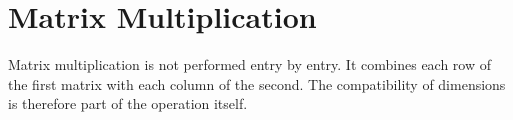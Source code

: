\section{Matrix Multiplication}

\begin{corebox}
Matrix multiplication is not performed entry by entry. It combines each row of the first matrix with each column of the second. The compatibility of dimensions is therefore part of the operation itself.
\end{corebox}





